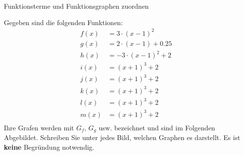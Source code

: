 \documentclass[
    ngerman,
    color=1b,
    load_common,
    leqno,
    boxarc,
    solution=true,
]{rubos-tuda-template}
\begin{document}
\clearpage
\begin{task}[points=3]{Funktionsterme und Funktionsgraphen zuordnen}
    \begin{grayInfoBox}
        Gegeben sind die folgenden Funktionen:\begin{align*}
            f(x)&=3\cdot(x-1)^2\\
            g(x)&=2\cdot(x-1)+0.25\\
            h(x)&=-3\cdot(x-1)^2+2\\
            i(x)&=(x+1)^3+2\\
            j(x)&=(x+1)^3+2\\
            k(x)&=(x+1)^3+2\\
            l(x)&=(x+1)^3+2\\
            m(x)&=(x+1)^3+2\\
        \end{align*}
        Ihre Grafen werden mit $G_f$, $G_g$ usw. bezeichnet und sind im Folgenden Abgebildet. Schreiben Sie unter jedes Bild, welchen Graphen es darstellt. Es ist \textbf{keine} Begründung notwendig.
    \end{grayInfoBox}
    \def\coordinatesystemradius{4}
    \begin{figure}[ht]
        \centering
        \begin{subfigure}[t]{.24\textwidth}
            \centering
\end{subfigure}
\end{figure}
\end{task}
\end{document}
